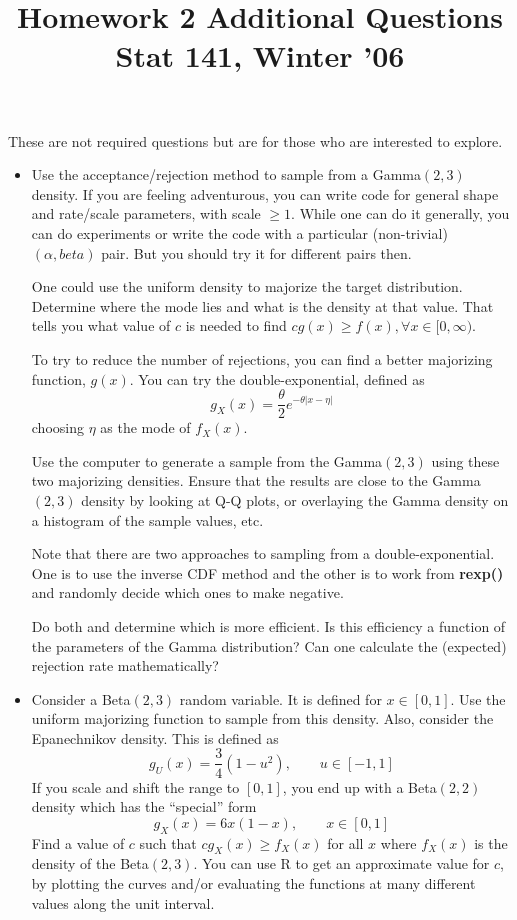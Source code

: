 \documentclass[11pt]{article}
\title{
 Homework 2 Additional Questions \hfil Stat 141, Winter '06   \\
}
\def\SFunction#1{\textbf{#1()}}
\begin{document}
\maketitle

These are  not required questions but are for those
who are interested to explore.

\begin{itemize}
  \item 

  Use the acceptance/rejection method to sample from a Gamma$(2, 3)$
  density.  If you are feeling adventurous, you can write code for
  general shape and rate/scale parameters, with scale $\ge 1$.  While
  one can do it generally, you can do experiments or write the code
  with a particular (non-trivial) $(\alpha, beta)$ pair.  But you
  should try it for different pairs then.
  
  One could use the uniform density to majorize the target
  distribution. Determine where the mode lies and what is the density
  at that value. That tells you what value of $c$ is needed to find $c
  g(x) \ge f(x), \forall x \in [0, \infty)$.

  To try to reduce the number of rejections, you can find a better 
  majorizing function, $g(x)$.
  You can try the double-exponential, defined as 
$$
  g_X(x) = \frac{\theta}{2}e^{-\theta \vert x - \eta \vert}
$$  
   choosing $\eta$ as the mode of $f_X(x)$.

   Use the computer to generate a sample from the Gamma$(2, 3)$ using
   these two majorizing densities. Ensure that the results are close to the
   Gamma$(2, 3)$ density by looking at Q-Q plots, or overlaying the Gamma
   density on a histogram of the sample values, etc.  

   Note that there are two approaches to sampling from a
   double-exponential. One is to use the inverse CDF method and the
   other is to work from \SFunction{rexp} and randomly
   decide which ones to make negative.

   Do both and determine which is more efficient. Is this
   efficiency a function of the parameters of the Gamma distribution?
   Can one calculate the (expected) rejection rate mathematically?

  \item 
   Consider a Beta$(2, 3)$ random  variable.
   It is defined for $x \in [0, 1]$.
   Use the uniform majorizing function
   to sample from this density.
   Also, consider the Epanechnikov
   density.
   This is defined as 
$$
  g_U(x) = \frac{3}{4}(1 - u^2), \qquad u \in [-1, 1]
$$ 
   If you scale and shift the range to $[0, 1]$, you end 
  up with a Beta$(2, 2)$ density which has the ``special''
  form
$$
  g_X(x) = 6x(1-x), \qquad x \in [0, 1]
$$
 Find a value of $c$ such that $c g_X(x) \ge f_X(x)$
 for all $x$ where $f_X(x)$ is the density of the Beta$(2, 3)$.
 You can use R to get an approximate value for $c$,
 by plotting the curves and/or evaluating the functions
 at many different values along the unit interval.
 

\end{itemize}
\end{document}
